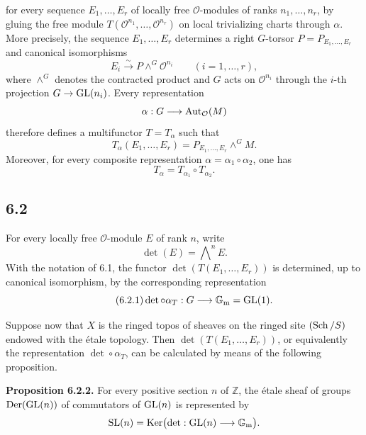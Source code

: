 for every sequence $E_1,\ldots,E_r$ of locally free $\mathcal O$-modules of
ranks $n_1,\ldots,n_r$, by gluing the free module
$T(\mathcal O^{n_1},\ldots,\mathcal O^{n_r})$ on local trivializing charts
through $\alpha$. More precisely, the sequence $E_1,\ldots,E_r$ determines a
right $G$-torsor $P=P_{E_1,\ldots,E_r}$ and canonical isomorphisms
\begin{equation}\tag{6.1.3}
E_i\xrightarrow{\sim}P\mathbin{\wedge^G}\mathcal O^{n_i}
\qquad(i=1,\ldots,r),
\end{equation}
where $\wedge^G$ denotes the contracted product and $G$ acts on
$\mathcal O^{n_i}$ through the $i$-th projection $G\to\operatorname{GL}(n_i)$. Every
representation
\[
\alpha:G\longrightarrow\operatorname{Aut}_{\mathcal O}(M)
\]
therefore defines a multifunctor $T=T_\alpha$ such that
\begin{equation}\tag{6.1.4}
T_\alpha(E_1,\ldots,E_r)
=P_{E_1,\ldots,E_r}\mathbin{\wedge^G}M.
\end{equation}
Moreover, for every composite representation
$\alpha=\alpha_1\circ\alpha_2$, one has
\begin{equation}\tag{6.1.5}
T_\alpha=T_{\alpha_1}\circ T_{\alpha_2}.
\end{equation}

\subsection*{6.2}
For every locally free $\mathcal O$-module $E$ of rank $n$, write
\[
\det(E)=\bigwedge\nolimits^n E.
\]
With the notation of 6.1, the functor $\det(T(E_1,\ldots,E_r))$ is
determined, up to canonical isomorphism, by the corresponding representation
\begin{equation}\tag{6.2.1}
\det\circ\alpha_T:G\longrightarrow\mathbb G_{\mathrm m}=\operatorname{GL}(1).
\end{equation}

Suppose now that $X$ is the ringed topos of sheaves on the ringed site
$(\operatorname{Sch}/S)$ endowed with the \'etale topology. Then
$\det(T(E_1,\ldots,E_r))$, or equivalently the representation
$\det\circ\alpha_T$, can be calculated by means of the following proposition.

\textbf{Proposition 6.2.2.}
For every positive section $n$ of $\mathbb Z$, the \'etale sheaf of groups
$\operatorname{Der}(\operatorname{GL}(n))$ of commutators of $\operatorname{GL}(n)$ is represented by
\[
\operatorname{SL}(n)=\operatorname{Ker}\bigl(\det:\operatorname{GL}(n)\longrightarrow\mathbb G_{\mathrm m}\bigr).
\]

